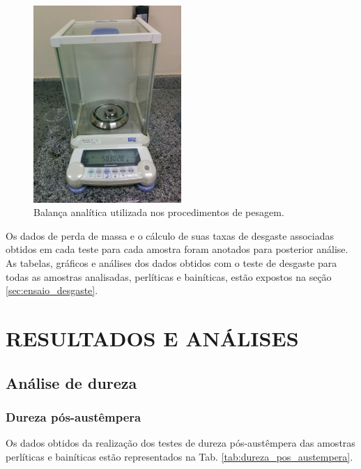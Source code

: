 \documentclass[
12pt,
openany, %
oneside, %
a4paper,			
english,			
brazil			        %
]{abntbibufjf}
\begin{document}
	\begin{figure}[H]
		\centering
		\includegraphics[width=0.5\textwidth]{balanca}
		\caption{Balança analítica utilizada nos procedimentos de pesagem.}
		\label{fig:balanca}
	\end{figure}

	Os dados de perda de massa e o cálculo de suas taxas de desgaste associadas obtidos em cada teste para cada amostra foram anotados para posterior análise. As tabelas, gráficos e análises dos dados obtidos com o teste de desgaste para todas as amostras analisadas, perlíticas e bainíticas, estão expostos na seção \ref{sec:ensaio_desgaste}.
	
	
	
\chapter{RESULTADOS E ANÁLISES}

\section{Análise de dureza}
\label{sec:analise_dureza}


\subsection{Dureza pós-austêmpera}
\label{sec:analise_dureza_pos_austempera}
	Os dados obtidos da realização dos testes de dureza pós-austêmpera das amostras perlíticas e bainíticas estão representados na Tab. \ref{tab:dureza_pos_austempera}.
	
\end{document}
